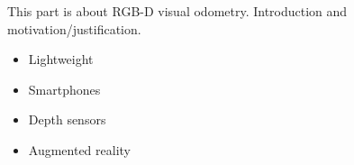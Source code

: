 This part is about RGB-D visual odometry.
Introduction and motivation/justification.

\begin{itemize}
	\item Lightweight
	\item Smartphones
	\item Depth sensors
	\item Augmented reality
\end{itemize}





